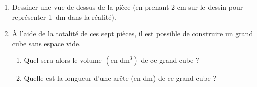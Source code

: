 \begin{enumerate}
\item Dessiner une vue de dessus de la pièce  (en prenant 2 cm sur le dessin pour représenter
1~dm dans la réalité).
\item À l'aide de la totalité de ces sept pièces, il est possible de construire un grand cube sans espace vide.
	\begin{enumerate}
		\item Quel sera alors le volume $\left(\text{en dm}^3\right)$ de ce grand cube ?
		\item Quelle est la longueur d'une arête (en dm) de ce grand cube ?
	\end{enumerate}
\end{enumerate}
